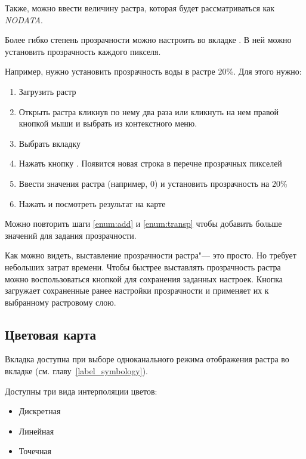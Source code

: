 Также, можно ввести величину растра, которая будет рассматриваться
как {\em NODATA}.

Более гибко степень прозрачности можно настроить во вкладке
. В ней можно установить
прозрачность каждого пикселя.

Например, нужно установить прозрачность воды в растре
 20\%. Для этого нужно:
\begin{enumerate}
 \item  Загрузить растр 
 \item Открыть  растра кликнув по нему два раза или
 кликнуть на нем правой кнопкой мыши и выбрать 
 из контекстного меню.
 \item Выбрать вкладку 
 \item \label{enum:add} Нажать кнопку
 . Появится
 новая строка в перечне прозрачных пикселей
 \item \label{enum:transp} Ввести значения растра (например, 0) и
 установить прозрачность на 20\%
 \item Нажать  и посмотреть результат на карте
\end{enumerate}

Можно повторить шаги \ref{enum:add} и \ref{enum:transp} чтобы добавить
больше значений для задания прозрачности.

Как можно видеть, выставление прозрачности растра"--- это просто. Но
требует небольших затрат времени. Чтобы быстрее выставлять прозрачность
растра можно воспользоваться кнопкой
 для сохранения заданных
настроек. Кнопка 
загружает сохраненные ранее настройки прозрачности и применяет их к
выбранному растровому слою.

\subsection{Цветовая карта} \label{label_colormaptab}

Вкладка  доступна при выборе одноканального режима
отображения растра во вкладке  (см. главу~\ref{label_symbology}).

Доступны три вида интерполяции цветов:
\begin{itemize}[label=--]
\item Дискретная
\item Линейная
\item Точечная
\end{itemize}

